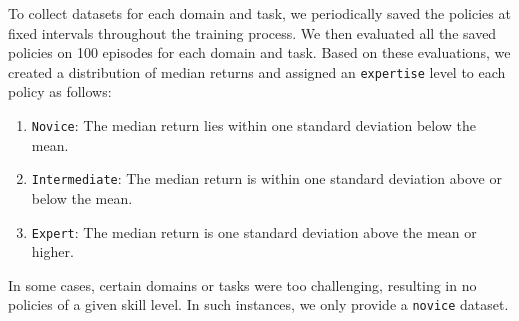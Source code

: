 To collect datasets for each domain and task, we periodically saved the policies at fixed intervals throughout the training process. We then evaluated all the saved policies on 100 episodes for each domain and task.
Based on these evaluations, we created a distribution of median returns and assigned an \texttt{expertise} level to each policy as follows:
\begin{enumerate}
\item \texttt{Novice}: The median return lies within one standard deviation below the mean.
\item \texttt{Intermediate}: The median return is within one standard deviation above or below the mean.
\item \texttt{Expert}: The median return is one standard deviation above the mean or higher.
\end{enumerate}
In some cases, certain domains or tasks were too challenging, resulting in no policies of a given skill level. In such instances, we only provide a \texttt{novice} dataset.